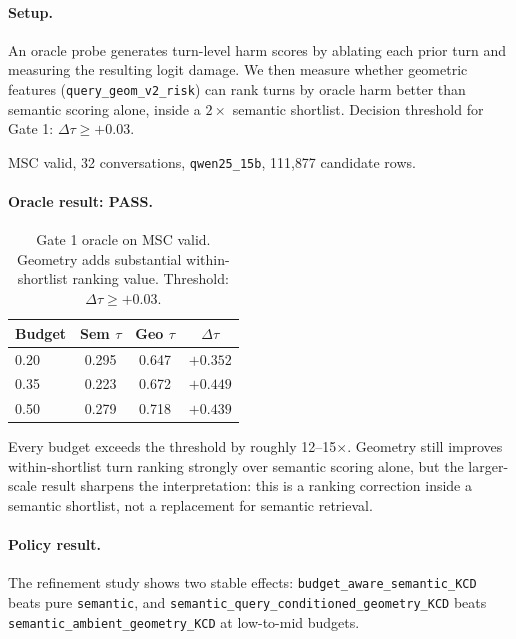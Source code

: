 \documentclass[conference]{IEEEtran}
\begin{document}
\paragraph{Setup.} An oracle probe generates turn-level harm scores by ablating
each prior turn and measuring the resulting logit damage. We then measure
whether geometric features (\texttt{query\_geom\_v2\_risk}) can rank turns by
oracle harm better than semantic scoring alone, inside a $2\times$ semantic
shortlist. Decision threshold for Gate 1: $\Delta\tau \geq +0.03$.

MSC valid, 32 conversations, \texttt{qwen25\_15b}, 111{,}877 candidate rows.

\paragraph{Oracle result: PASS.}

\begin{table}[t]
  \centering
  \caption{Gate 1 oracle on MSC valid. Geometry adds substantial within-shortlist
  ranking value. Threshold: $\Delta\tau \geq +0.03$.}
  \label{tab:gate1_msc}
  \begin{tabular}{lccc}
    \toprule
    Budget & Sem $\tau$ & Geo $\tau$ & $\Delta\tau$ \\
    \midrule
    0.20 & 0.295 & 0.647 & $+0.352$ \\
    0.35 & 0.223 & 0.672 & $+0.449$ \\
    0.50 & 0.279 & 0.718 & $+0.439$ \\
    \bottomrule
  \end{tabular}
\end{table}

Every budget exceeds the threshold by roughly 12--15$\times$. Geometry still
improves within-shortlist turn ranking strongly over semantic scoring alone,
but the larger-scale result sharpens the interpretation: this is a ranking
correction inside a semantic shortlist, not a replacement for semantic retrieval.

\paragraph{Policy result.} The refinement study shows two stable effects:
\texttt{budget\_aware\_semantic\_KCD} beats pure \texttt{semantic}, and
\texttt{semantic\_query\_conditioned\_geometry\_KCD} beats
\texttt{semantic\_ambient\_geometry\_KCD} at low-to-mid budgets.
\end{document}
